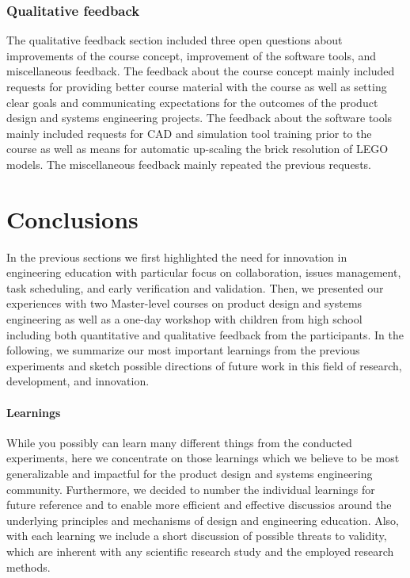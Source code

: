 \documentclass{PDS}
\begin{document}
\subsubsection{Qualitative feedback}
\label{sec:qualitative}

The qualitative feedback section included three open questions about improvements of the course concept, improvement of the software tools, and miscellaneous feedback.
The feedback about the course concept mainly included requests for providing better course material with the course as well as setting clear goals and communicating expectations for the outcomes of the product design and systems engineering projects.
The feedback about the software tools mainly included requests for CAD and simulation tool training prior to the course as well as means for automatic up-scaling the brick resolution of LEGO models. The miscellaneous feedback mainly repeated the previous requests.

\section{Conclusions}
\label{sec:conclusion}

In the previous sections we first highlighted the need for innovation in engineering education with particular focus on collaboration, issues management, task scheduling, and early verification and validation.
Then, we presented our experiences with two Master-level courses on product design and systems engineering as well as a one-day workshop with children from high school including both quantitative and qualitative feedback from the participants.
In the following, we summarize our most important learnings from the previous experiments and sketch possible directions of future work in this field of research, development, and innovation.

\paragraph{Learnings}

While you possibly can learn many different things from the conducted experiments, here we concentrate on those learnings which we believe to be most generalizable and impactful for the product design and systems engineering community.
Furthermore, we decided to number the individual learnings for future reference and to enable more efficient and effective discussios around the underlying principles and mechanisms of design and engineering education.
Also, with each learning we include a short discussion of possible threats to validity, which are inherent with any scientific research study and the employed research methods.
\end{document}
